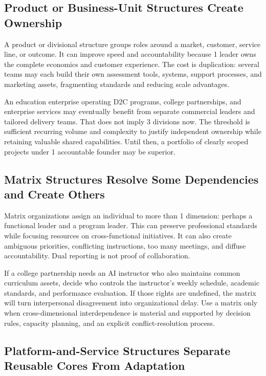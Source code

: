 \subsection{Product or Business-Unit Structures Create Ownership}
\label{sec:product_business_unit_structures}

A product or divisional structure groups roles around a market, customer, service line, or outcome. It can improve speed and accountability because 1 leader owns the complete economics and customer experience. The cost is duplication: several teams may each build their own assessment tools, systems, support processes, and marketing assets, fragmenting standards and reducing scale advantages.

An education enterprise operating D2C programs, college partnerships, and enterprise services may eventually benefit from separate commercial leaders and tailored delivery teams. That does not imply 3 divisions now. The threshold is sufficient recurring volume and complexity to justify independent ownership while retaining valuable shared capabilities. Until then, a portfolio of clearly scoped projects under 1 accountable founder may be superior.

\subsection{Matrix Structures Resolve Some Dependencies and Create Others}
\label{sec:matrix_structures}

Matrix organizations assign an individual to more than 1 dimension: perhaps a functional leader and a program leader. This can preserve professional standards while focusing resources on cross-functional initiatives. It can also create ambiguous priorities, conflicting instructions, too many meetings, and diffuse accountability. Dual reporting is not proof of collaboration.

If a college partnership needs an AI instructor who also maintains common curriculum assets, decide who controls the instructor's weekly schedule, academic standards, and performance evaluation. If those rights are undefined, the matrix will turn interpersonal disagreement into organizational delay. Use a matrix only when cross-dimensional interdependence is material and supported by decision rules, capacity planning, and an explicit conflict-resolution process.

\subsection{Platform-and-Service Structures Separate Reusable Cores From Adaptation}
\label{sec:platform_service_structures}

